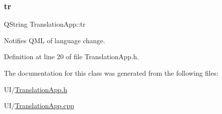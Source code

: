 \subsubsection{\texorpdfstring{tr}{tr}}
{\footnotesize\ttfamily Q\+String Translation\+App\+::tr\hspace{0.3cm}{\ttfamily [read]}}



Notifies Q\+ML of language change. 



Definition at line 20 of file Translation\+App.\+h.



The documentation for this class was generated from the following files\+:\begin{DoxyCompactItemize}
\item 
U\+I/\hyperlink{_translation_app_8h}{Translation\+App.\+h}\item 
U\+I/\hyperlink{_translation_app_8cpp}{Translation\+App.\+cpp}\end{DoxyCompactItemize}
